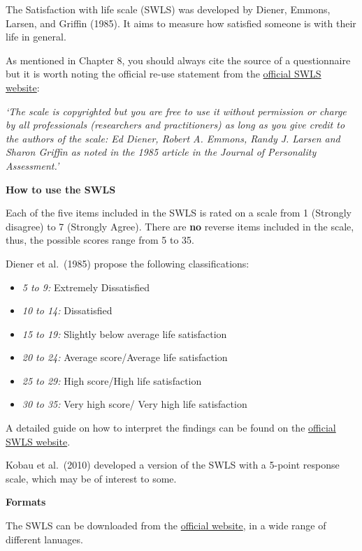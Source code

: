 \documentclass[
]{book}
\providecommand{\tightlist}{%
  \setlength{\itemsep}{0pt}\setlength{\parskip}{0pt}}
\begin{document}
The Satisfaction with life scale (SWLS) was developed by Diener, Emmons, Larsen, and Griffin (1985). It aims to measure how satisfied someone is with their life in general.

As mentioned in Chapter 8, you should always cite the source of a questionnaire but it is worth noting the official re-use statement from the \href{http://labs.psychology.illinois.edu/~ediener/SWLS.html}{official SWLS website}:

\emph{`The scale is copyrighted but you are free to use it without permission or charge by all professionals (researchers and practitioners) as long as you give credit to the authors of the scale: Ed Diener, Robert A. Emmons, Randy J. Larsen and Sharon Griffin as noted in the 1985 article in the Journal of Personality Assessment.'}

\textbf{How to use the SWLS}

Each of the five items included in the SWLS is rated on a scale from 1 (Strongly disagree) to 7 (Strongly Agree). There are \textbf{no} reverse items included in the scale, thus, the possible scores range from 5 to 35.

Diener et al.~(1985) propose the following classifications:

\begin{itemize}
\tightlist
\item
  \emph{5 to 9:} Extremely Dissatisfied
\item
  \emph{10 to 14:} Dissatisfied
\item
  \emph{15 to 19:} Slightly below average life satisfaction
\item
  \emph{20 to 24:} Average score/Average life satisfaction
\item
  \emph{25 to 29:} High score/High life satisfaction
\item
  \emph{30 to 35:} Very high score/ Very high life satisfaction
\end{itemize}

A detailed guide on how to interpret the findings can be found on the \href{http://labs.psychology.illinois.edu/~ediener/SWLS.html}{official SWLS website}.

Kobau et al.~(2010) developed a version of the SWLS with a 5-point response scale, which may be of interest to some.

\textbf{Formats}

The SWLS can be downloaded from the \href{http://labs.psychology.illinois.edu/~ediener/SWLS.html}{official website}, in a wide range of different lanuages.
\end{document}
